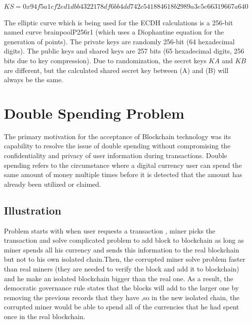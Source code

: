 $KS = 0x94f5a1cf2ed1dbb4322178df6bb4dd742c541884618b2989a3e5e66319667a640$

The elliptic curve which is being used for the \ac{ECDH} calculations is a 256-bit named curve brainpoolP256r1 (which uses a Diophantine equation for the generation of points). The private keys are randomly 256-bit (64 hexadecimal digits). The public keys and shared keys are 257 bits (65 hexadecimal digits, 256 bits due to key compression). Due to randomization, the secret keys $KA$ and $KB$ are different, but the calculated shared secret key between (A) and (B) will always be the same.

\section{Double Spending Problem}

The primary motivation for the acceptance of Blockchain technology was its capability to resolve the issue of double spending without compromising the confidentiality and privacy of user information during transactions. Double spending refers to the circumstance where a digital currency user can spend the same amount of money multiple times before it is detected that the amount has already been utilized or claimed.
\subsection{Illustration}

Problem starts with when user requests a transaction , miner picks the transaction and solve complicated problem to add block to blockchain as long as miner spends all his currency and sends this information to the real blockchain but not to his own isolated chain.Then, the corrupted miner solve problem faster than real miners (they are needed to verify the block and add it to blockchain) and he make an isolated blockchain bigger than the real one. 
As a result, the democratic governance rule states that the blocks will add to the larger one by removing the previous records that they have ,so in the new isolated chain, the corrupted miner would be able to spend all of the currencies that he had spent once in the real blockchain.

